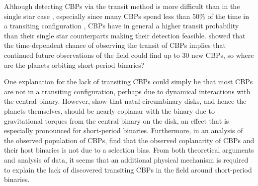 Although detecting CBPs via the transit method is more difficult than in the single star case \citep{Welsh2014,Winn2015}, especially since many CBPs spend less than $50 \%$ of the time in a transiting configuration \citep{Martin2017}, CBPs have in general a higher transit probability than their single star counterparts \citep{Martin2015a} making their detection feasible.  \citet{Martin2017} showed that the time-dependent chance of observing the transit of CBPs implies that continued future observations of the \kepler field could find up to 30 new CBPs, so where are the planets orbiting short-period binaries?

One explanation for the lack of transiting CBPs could simply be that most CBPs are not in a transiting configuration, perhaps due to dynamical interactions with the central binary.  However, \citet{Foucart2013} show that natal circumbinary disks, and hence the planets themselves, should be nearly coplanar with the binary due to gravitational torques from the central binary on the disk, an effect that is especially pronounced for short-period binaries.  Furthermore, in an analysis of the observed population of \kepler CBPs, \citet{Li2016} find that the observed coplanarity of CBPs and their host binaries is not due to a selection bias.  From both theoretical arguments and analysis of \kepler data, it seems that an additional physical mechanism is required to explain the lack of discovered transiting CBPs in the \kepler field around short-period binaries.


